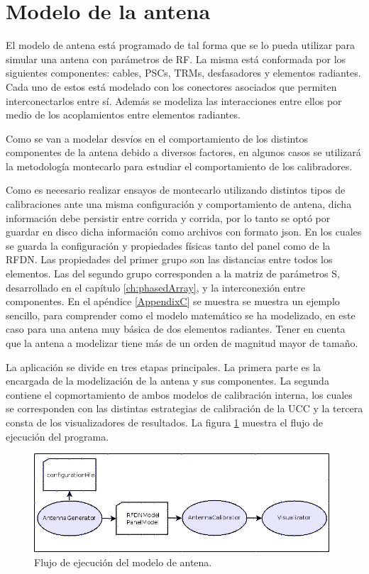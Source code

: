 \section{Modelo de la antena}

El modelo de antena está programado de tal forma que se lo pueda utilizar para simular una antena con parámetros de RF. La
misma está conformada por los siguientes componentes: cables, PSCs, TRMs, desfasadores y elementos radiantes. Cada uno de estos
está modelado con los conectores asociados que permiten interconectarlos entre sí. Además se modeliza las interacciones entre
ellos por medio de los acoplamientos entre elementos radiantes. 

Como se van a modelar desvíos en el comportamiento de los distintos componentes de la antena debido a diversos factores, en
algunos casos se utilizará la metodología montecarlo para estudiar el comportamiento de los calibradores.

Como es necesario realizar ensayos de montecarlo utilizando distintos tipos de calibraciones ante una misma configuración y 
comportamiento de antena, dicha información debe persistir entre corrida y corrida, por lo tanto se optó por guardar en disco
dicha información como archivos con formato json. En los cuales se guarda la configuración y propiedades físicas tanto del
panel como de la RFDN. Las propiedades del primer grupo son las distancias entre todos los elementos. Las del segundo grupo
corresponden a la matriz de parámetros S, desarrollado en el capítulo \ref{ch:phasedArray}, y la interconexión entre
componentes. En el apéndice \ref{AppendixC} se muestra se muestra un ejemplo sencillo, para comprender como el modelo
matemático se ha modelizado, en este caso para una antena muy básica de dos elementos radiantes. Tener en cuenta que la antena
a modelizar tiene más de un orden de magnitud mayor de tamaño.

La aplicación se divide en tres etapas principales. La primera parte es la encargada de la modelización de la antena y sus
componentes. La segunda contiene el copmortamiento de ambos modelos de calibración interna, los cuales se corresponden con las
distintas estrategias de calibración de la UCC y la tercera consta de los visualizadores de resultados. La figura
\ref{fig:prog_inic} muestra el flujo de ejecución del programa.

\begin{figure}
 \centering
 \includegraphics[width=11cm]{gfx/FlujoEjecucion.png}
 \caption{Flujo de ejecuci\'on del modelo de antena.}
 \label{fig:prog_inic}
\end{figure}

